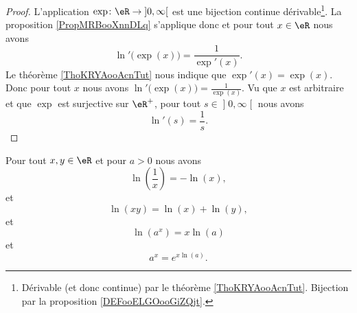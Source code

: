 \begin{proof}
	L'application \( \exp\colon \eR\to \mathopen] 0 , \infty \mathclose[\) est une bijection continue dérivable\footnote{Dérivable (et donc continue) par le théorème \ref{ThoKRYAooAcnTut}. Bijection par la proposition \ref{DEFooELGOooGiZQjt}.}. La proposition \ref{PropMRBooXnnDLq} s'applique donc et pour tout \( x\in \eR\) nous avons
		\begin{equation}
			\ln'\big( \exp(x) \big)=\frac{1}{ \exp'(x) }.
		\end{equation}
		Le théorème \ref{ThoKRYAooAcnTut} nous indique que \( \exp'(x)=\exp(x)\). Donc pour tout \( x\) nous avons \( \ln'\big( \exp(x) \big)=\frac{1}{  \exp(x) }\). Vu que \( x\) est arbitraire et que \( \exp\) est surjective sur \( \eR^+\), pour tout \( s\in \mathopen] 0 , \infty \mathclose[\) nous avons
	\begin{equation}
		\ln'(s)=\frac{1}{ s }.
	\end{equation}
\end{proof}

\begin{proposition}      \label{PROPooLAOWooEYvXmI}
	Pour tout \( x,y\in \eR\) et pour \( a>0\) nous avons
	\begin{equation}
		\ln(\frac{1}{ x })=-\ln(x),
	\end{equation}
	et
	\begin{equation}        \label{EQooJVMUooVpUKyo}
		\ln(xy)=\ln(x)+\ln(y),
	\end{equation}
	et
	\begin{equation}        \label{EQooEJQSooWCczXy}
		\ln(a^x)=x\ln(a)
	\end{equation}
	et
	\begin{equation}
		a^x= e^{x\ln(a)}.
	\end{equation}
\end{proposition}

